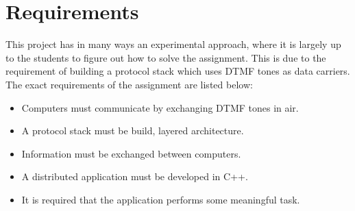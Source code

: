 \section{Requirements}
This project has in many ways an experimental approach, where it is largely up to the students to figure out how to solve the assignment. This is due to the requirement of building a protocol stack which uses DTMF tones as data carriers. The exact requirements of the assignment are listed below:

\begin{itemize}
\item Computers must communicate by exchanging DTMF tones in air.
\item A protocol stack must be build, layered architecture.
\item Information must be exchanged between computers.
\item A distributed application must be developed in C++.
\item It is required that the application performs some meaningful task.
\end{itemize}